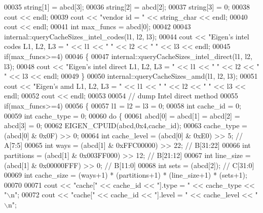 \begin{DoxyCode}
00035   \textcolor{keywordtype}{string}[1] = abcd[3];
00036   \textcolor{keywordtype}{string}[2] = abcd[2];
00037   \textcolor{keywordtype}{string}[3] = 0;
00038   cout << endl;
00039   cout << \textcolor{stringliteral}{"vendor id = "} << string\_char << endl;
00040   cout << endl;
00041   \textcolor{keywordtype}{int} max\_funcs = abcd[0];
00042 
00043   internal::queryCacheSizes\_intel\_codes(l1, l2, l3);
00044   cout << \textcolor{stringliteral}{"Eigen's intel codes L1, L2, L3 = "} << l1 << \textcolor{stringliteral}{" "} << l2 << \textcolor{stringliteral}{" "} << l3 << endl;
00045   \textcolor{keywordflow}{if}(max\_funcs>=4)
00046   \{
00047     internal::queryCacheSizes\_intel\_direct(l1, l2, l3);
00048     cout << \textcolor{stringliteral}{"Eigen's intel direct L1, L2, L3 = "} << l1 << \textcolor{stringliteral}{" "} << l2 << \textcolor{stringliteral}{" "} << l3 << endl;
00049   \}
00050   internal::queryCacheSizes\_amd(l1, l2, l3);
00051   cout << \textcolor{stringliteral}{"Eigen's amd L1, L2, L3         = "} << l1 << \textcolor{stringliteral}{" "} << l2 << \textcolor{stringliteral}{" "} << l3 << endl;
00052   cout << endl;
00053   
00054   \textcolor{comment}{// dump Intel direct method}
00055   \textcolor{keywordflow}{if}(max\_funcs>=4)
00056   \{
00057     l1 = l2 = l3 = 0;
00058     \textcolor{keywordtype}{int} cache\_id = 0;
00059     \textcolor{keywordtype}{int} cache\_type = 0;
00060     \textcolor{keywordflow}{do} \{
00061       abcd[0] = abcd[1] = abcd[2] = abcd[3] = 0;
00062       EIGEN\_CPUID(abcd,0x4,cache\_id);
00063       cache\_type  = (abcd[0] & 0x0F) >> 0;
00064       \textcolor{keywordtype}{int} cache\_level = (abcd[0] & 0xE0) >> 5;  \textcolor{comment}{// A[7:5]}
00065       \textcolor{keywordtype}{int} ways        = (abcd[1] & 0xFFC00000) >> 22; \textcolor{comment}{// B[31:22]}
00066       \textcolor{keywordtype}{int} partitions  = (abcd[1] & 0x003FF000) >> 12; \textcolor{comment}{// B[21:12]}
00067       \textcolor{keywordtype}{int} line\_size   = (abcd[1] & 0x00000FFF) >>  0; \textcolor{comment}{// B[11:0]}
00068       \textcolor{keywordtype}{int} sets        = (abcd[2]);                    \textcolor{comment}{// C[31:0]}
00069       \textcolor{keywordtype}{int} cache\_size = (ways+1) * (partitions+1) * (line\_size+1) * (sets+1);
00070       
00071       cout << \textcolor{stringliteral}{"cache["} << cache\_id << \textcolor{stringliteral}{"].type       = "} << cache\_type << \textcolor{stringliteral}{"\(\backslash\)n"};
00072       cout << \textcolor{stringliteral}{"cache["} << cache\_id << \textcolor{stringliteral}{"].level      = "} << cache\_level << \textcolor{stringliteral}{"\(\backslash\)n"};

\end{DoxyCode}
